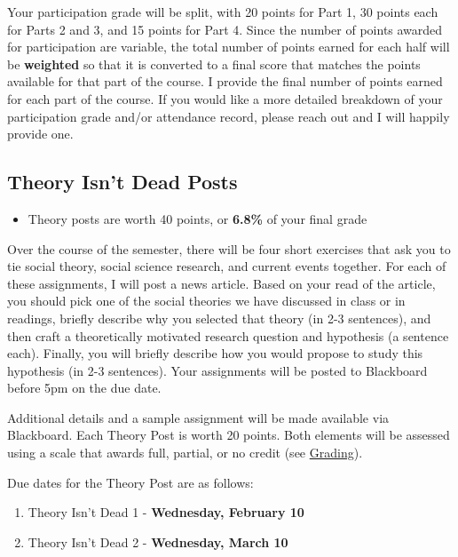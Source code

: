 \documentclass[
]{book}
\providecommand{\tightlist}{%
  \setlength{\itemsep}{0pt}\setlength{\parskip}{0pt}}
\newenvironment{rmdblock}[1]
  {\begin{shaded*}
  \begin{itemize}
  \renewcommand{\labelitemi}{
    \raisebox{-.7\height}[0pt][0pt]{
      {\setkeys{Gin}{width=3em,keepaspectratio}\texttt{[image: images/\#1]}}
    }
  }
  \item
  }
  {
  \end{itemize}
  \end{shaded*}
  }
\newenvironment{rmdtip}
  {\begin{rmdblock}{tip}}
  {\end{rmdblock}}
\begin{document}
Your participation grade will be split, with 20 points for Part 1, 30 points each for Parts 2 and 3, and 15 points for Part 4. Since the number of points awarded for participation are variable, the total number of points earned for each half will be \textbf{weighted} so that it is converted to a final score that matches the points available for that part of the course. I provide the final number of points earned for each part of the course. If you would like a more detailed breakdown of your participation grade and/or attendance record, please reach out and I will happily provide one.

\hypertarget{theory-isnt-dead-posts}{%
\subsection{Theory Isn't Dead Posts}\label{theory-isnt-dead-posts}}

\begin{rmdtip}
Theory posts are worth 40 points, or \textbf{6.8\%} of your final grade
\end{rmdtip}

Over the course of the semester, there will be four short exercises that ask you to tie social theory, social science research, and current events together. For each of these assignments, I will post a news article. Based on your read of the article, you should pick one of the social theories we have discussed in class or in readings, briefly describe why you selected that theory (in 2-3 sentences), and then craft a theoretically motivated research question and hypothesis (a sentence each). Finally, you will briefly describe how you would propose to study this hypothesis (in 2-3 sentences). Your assignments will be posted to Blackboard before 5pm on the due date.

Additional details and a sample assignment will be made available via Blackboard. Each Theory Post is worth 20 points. Both elements will be assessed using a scale that awards full, partial, or no credit (see \href{grading.html}{Grading}).

Due dates for the Theory Post are as follows:

\begin{enumerate}
\def\labelenumi{\arabic{enumi}.}
\tightlist
\item
  Theory Isn't Dead 1 - \textbf{Wednesday, February 10}
\item
  Theory Isn't Dead 2 - \textbf{Wednesday, March 10}
\end{enumerate}
\end{document}
